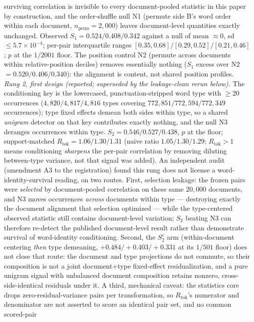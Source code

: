 surviving correlation is invisible to every document-pooled statistic in this paper by
construction, and the order-shuffle null N1 (permute side B's word order within each
document, $n_{\text{perm}}{=}2{,}000$) leaves document-level quantities exactly unchanged.
Observed $S_1=0.524/0.408/0.342$ against a null of mean ${\approx}0$, sd
$\le5.7\times10^{-4}$; per-pair interquartile ranges $[0.35,0.68]/[0.29,0.52]/[0.21,0.46]$;
$p$ at the $1/2001$ floor. The position control N2 (permute across documents within
relative-position deciles) removes essentially nothing ($S_1$ excess over N2
$=0.520/0.406/0.340$): the alignment is content, not shared position profiles.
\emph{Rung 2, first design (reported; superseded by the leakage-clean rerun below).} The conditioning key is the lowercased,
punctuation-stripped word type with $\ge20$ occurrences
($4{,}820/4{,}817/4{,}816$ types covering $772{,}851/772{,}594/772{,}349$ occurrences);
type fixed effects demean both sides within type, so a shared \emph{unigram} detector on
that key contributes exactly nothing, and the null N3 deranges occurrences within type.
$S_2=0.546/0.527/0.438$, $p$ at the floor; support-matched
$R_{\text{tok}}=1.06/1.30/1.31$ (naive ratio $1.05/1.30/1.29$; $R_{\text{tok}}>1$ means
conditioning \emph{sharpens} the per-pair correlation by removing diluting between-type
variance, not that signal was added). An independent audit (amendment A3 to the registration)
found this rung does not license a word-identity-survival reading, on two routes. First,
selection leakage: the frozen pairs were \emph{selected} by document-pooled correlation on
these same $20{,}000$ documents, and N3 moves occurrences \emph{across} documents within
type --- destroying exactly the document alignment that selection optimized --- while the
type-centered observed statistic still contains document-level variation; $S_2$ beating N3
can therefore re-detect the published document-level result rather than demonstrate
survival of word-identity conditioning. Second, the $S_2^{c}$ arm (within-document
centering \emph{then} type demeaning, $+0.484/+0.403/+0.331$ at its $1/501$ floor) does
not close that route: the document and type projections do not commute, so their
composition is not a joint document$+$type fixed-effect residualization, and a pure
unigram signal with unbalanced document composition retains nonzero, cross-side-identical
residuals under it. A third, mechanical caveat: the statistics core drops
zero-residual-variance pairs per transformation, so $R_{\text{tok}}$'s numerator and
denominator are not asserted to score an identical pair set, and no common scored-pair
